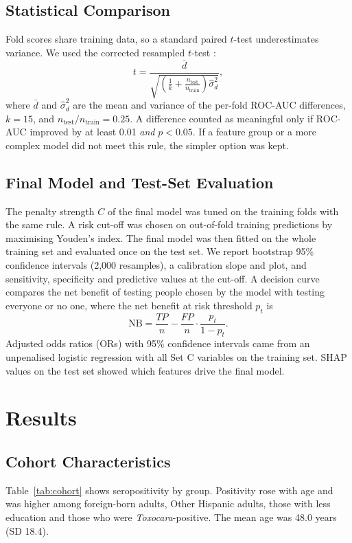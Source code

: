 \documentclass[conference]{IEEEtran}
\begin{document}
\subsection{Statistical Comparison}
Fold scores share training data, so a standard paired $t$-test underestimates variance. We used the corrected resampled $t$-test \cite{nadeau2003}:
\begin{equation}
t = \frac{\bar{d}}{\sqrt{\left(\frac{1}{k} + \frac{n_{\text{test}}}{n_{\text{train}}}\right)\hat{\sigma}_d^2}},
\end{equation}
where $\bar{d}$ and $\hat{\sigma}_d^2$ are the mean and variance of the per-fold ROC-AUC differences, $k=15$, and $n_{\text{test}}/n_{\text{train}} = 0.25$. A difference counted as meaningful only if ROC-AUC improved by at least 0.01 \emph{and} $p<0.05$. If a feature group or a more complex model did not meet this rule, the simpler option was kept.

\subsection{Final Model and Test-Set Evaluation}
The penalty strength $C$ of the final model was tuned on the training folds with the same rule. A risk cut-off was chosen on out-of-fold training predictions by maximising Youden's index. The final model was then fitted on the whole training set and evaluated once on the test set. We report bootstrap 95\% confidence intervals (2,000 resamples), a calibration slope and plot, and sensitivity, specificity and predictive values at the cut-off. A decision curve compares the net benefit of testing people chosen by the model with testing everyone or no one, where the net benefit at risk threshold $p_t$ is
\begin{equation}
\text{NB} = \frac{TP}{n} - \frac{FP}{n}\cdot\frac{p_t}{1-p_t}.
\end{equation}
Adjusted odds ratios (ORs) with 95\% confidence intervals came from an unpenalised logistic regression with all Set C variables on the training set. SHAP values \cite{lundberg2017} on the test set showed which features drive the final model.

\section{Results}

\subsection{Cohort Characteristics}
Table~\ref{tab:cohort} shows seropositivity by group. Positivity rose with age and was higher among foreign-born adults, Other Hispanic adults, those with less education and those who were \textit{Toxocara}-positive. The mean age was 48.0 years (SD 18.4).
\end{document}
